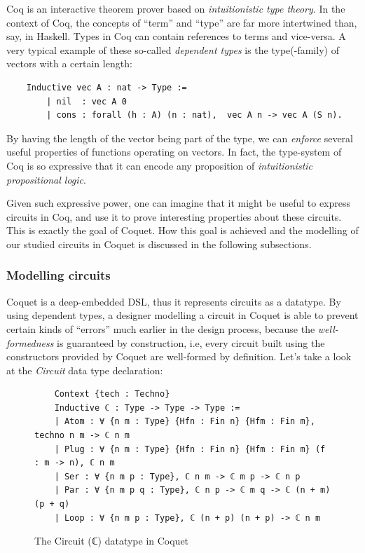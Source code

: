 \documentclass[a4paper]{article}
\begin{document}
            Coq is an interactive theorem prover based on \emph{intuitionistic type theory}. In the
            context of Coq, the concepts of ``term'' and ``type'' are far more intertwined than,
            say, in Haskell. Types in Coq can contain references to terms and vice-versa. A very
            typical example of these so-called \emph{dependent types} is the type(-family) of
            vectors with a certain length:
            \begin{verbatim}
    Inductive vec A : nat -> Type :=
        | nil  : vec A 0
        | cons : forall (h : A) (n : nat),  vec A n -> vec A (S n).
            \end{verbatim}

            By having the length of the vector being part of the type, we can \emph{enforce} several
            useful properties of functions operating on vectors. In fact, the type-system of Coq is
            so expressive that it can encode any proposition of \emph{intuitionistic propositional
                logic}.

            Given such expressive power, one can imagine that it might be useful to express circuits
            in Coq, and use it to prove interesting properties about these circuits. This is exactly
            the goal of Coquet. How this goal is achieved and the modelling of our studied circuits
            in Coquet is discussed in the following subsections.

            \subsubsection{Modelling circuits}
            \label{subsubsec:coquet-modelling}
                Coquet is a deep-embedded DSL, thus it represents circuits as a datatype. By using
                dependent types, a designer modelling a circuit in Coquet is able to prevent certain
                kinds of ``errors'' much earlier in the design process, because the
                \emph{well-formedness} is guaranteed by construction, i.e, every circuit built using
                the constructors provided by Coquet are well-formed by definition. Let's take a look
                at the \emph{Circuit} data type declaration:
                \begin{figure}[h!]
                    \begin{center}
                        \begin{verbatim}
    Context {tech : Techno}
    Inductive ℂ : Type -> Type -> Type :=
    | Atom : ∀ {n m : Type} {Hfn : Fin n} {Hfm : Fin m}, techno n m -> ℂ n m
    | Plug : ∀ {n m : Type} {Hfn : Fin n} {Hfm : Fin m} (f : m -> n), ℂ n m
    | Ser : ∀ {n m p : Type}, ℂ n m -> ℂ m p -> ℂ n p
    | Par : ∀ {n m p q : Type}, ℂ n p -> ℂ m q -> ℂ (n + m) (p + q)
    | Loop : ∀ {n m p : Type}, ℂ (n + p) (n + p) -> ℂ n m
                        \end{verbatim}
                    \end{center}
                    \caption{The Circuit (ℂ) datatype in Coquet
                        \label{fig:coquet-circuit-type}}
                \end{figure}
\end{document}
